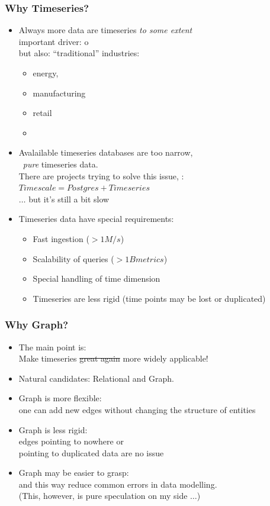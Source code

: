 \documentclass{beamer}
\begin{document}
\begin{frame}[shrink]
\frametitle{Why Timeseries?}
\begin{itemize}
\item Always more data are timeseries \emph{to some extent}\\
      important driver: o\\
      but also: ``traditional'' industries:
      \begin{itemize} 
      \item energy,
      \item manufacturing
      \item retail
      \item \etc
      \end{itemize}
\item Avalailable timeseries databases are too narrow,\\
      \ie\ \emph{pure} timeseries data.\\
      There are projects trying to solve this issue,
      \eg:
      $Timescale = Postgres + Timeseries$ \\
      $\dots$ but it's still a bit slow

\item Timeseries data have special requirements:
      \begin{itemize}
      \item Fast ingestion ($> 1M/s$)
      \item Scalability of queries ($> 1B metrics$)
      \item Special handling of time dimension
      \item Timeseries are less rigid
            (time points may be lost or duplicated)
      \end{itemize}
\end{itemize}
\end{frame}
\begin{frame}

\frametitle{Why Graph?}
\begin{itemize}
\item The main point is:\\
      Make timeseries \st{great again} more widely applicable!
\item Natural candidates: Relational and Graph.
\item Graph is more flexible:\\
      one can add new edges without changing the structure of entities
\item Graph is less rigid:\\
      edges pointing to nowhere or\\
            pointing to duplicated data are no issue
\item Graph may be easier to grasp:\\
      and this way reduce common errors in data modelling.\\
      (This, however, is pure speculation on my side $\dots$)
\end{itemize}
\end{frame}
\end{document}
